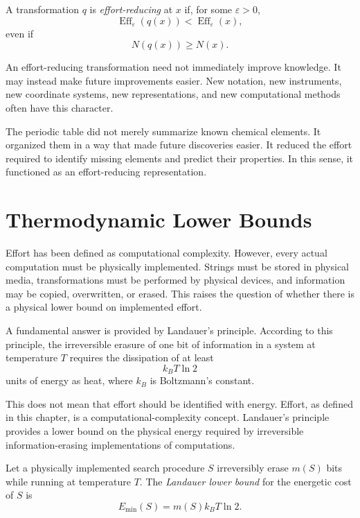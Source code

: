 \begin{definition}
A transformation \(q\) is \emph{effort-reducing} at \(x\) if, for some \(\varepsilon>0\),
\[
\operatorname{Eff}_{\varepsilon}(q(x))<\operatorname{Eff}_{\varepsilon}(x),
\]
even if
\[
N(q(x))\geq N(x).
\]
\end{definition}

An effort-reducing transformation need not immediately improve knowledge. It may instead make future improvements easier. New notation, new instruments, new coordinate systems, new representations, and new computational methods often have this character.

\begin{example}
The periodic table did not merely summarize known chemical elements. It organized them in a way that made future discoveries easier. It reduced the effort required to identify missing elements and predict their properties. In this sense, it functioned as an effort-reducing representation.
\end{example}

\section{Thermodynamic Lower Bounds}
\label{sec:thermodynamic_effort}

Effort has been defined as computational complexity. However, every actual computation must be physically implemented. Strings must be stored in physical media, transformations must be performed by physical devices, and information may be copied, overwritten, or erased. This raises the question of whether there is a physical lower bound on implemented effort.

A fundamental answer is provided by Landauer's principle. According to this principle, the irreversible erasure of one bit of information in a system at temperature \(T\) requires the dissipation of at least
\[
k_B T\ln 2
\]
units of energy as heat, where \(k_B\) is Boltzmann's constant.

This does not mean that effort should be identified with energy. Effort, as defined in this chapter, is a computational-complexity concept. Landauer's principle provides a lower bound on the physical energy required by irreversible information-erasing implementations of computations.

\begin{definition}
Let a physically implemented search procedure \(S\) irreversibly erase \(m(S)\) bits while running at temperature \(T\). The \emph{Landauer lower bound} for the energetic cost of \(S\) is
\[
E_{\min}(S)=m(S)k_B T\ln 2.
\]
\end{definition}


